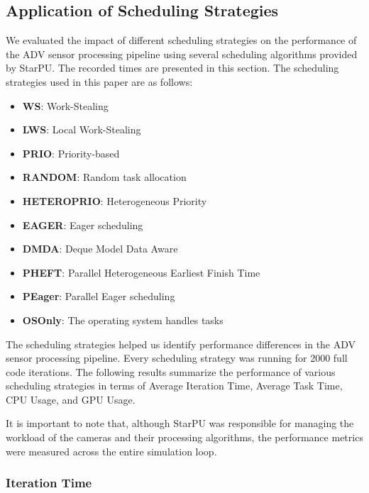 \documentclass[conference]{IEEEtran}
\begin{document}
\subsection{Application of Scheduling Strategies}

We evaluated the impact of different scheduling strategies on the performance of the ADV sensor processing pipeline using several scheduling algorithms provided by StarPU. The recorded times are presented in this section. The scheduling strategies used in this paper are as follows:

\begin{itemize}
    \item \textbf{WS}: Work-Stealing
    \item \textbf{LWS}: Local Work-Stealing
    \item \textbf{PRIO}: Priority-based
    \item \textbf{RANDOM}: Random task allocation
    \item \textbf{HETEROPRIO}: Heterogeneous Priority
    \item \textbf{EAGER}: Eager scheduling
    \item \textbf{DMDA}: Deque Model Data Aware
    \item \textbf{PHEFT}: Parallel Heterogeneous Earliest Finish Time
    \item \textbf{PEager}: Parallel Eager scheduling
    \item \textbf{OSOnly}: The operating system handles tasks %
\end{itemize}

The scheduling strategies helped us identify performance differences in the ADV sensor processing pipeline.
 Every scheduling strategy was running for 2000 full code iterations. The following results summarize the performance of various scheduling strategies in terms of Average Iteration Time, Average Task Time, CPU Usage, and GPU Usage.

It is important to note that, although StarPU was responsible for managing the workload of the cameras and their processing algorithms, the performance metrics were measured across the entire simulation loop.


\subsubsection{Iteration Time}
\end{document}
